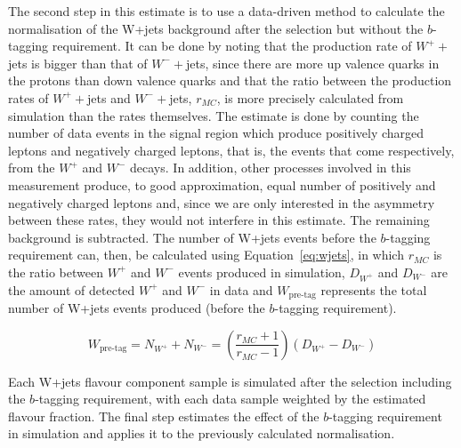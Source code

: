 The second step in this estimate is to use a data-driven method to calculate the normalisation of the W+jets background after the selection but without the $b$-tagging
requirement.
It can be done by noting that the production rate of $W^{+}+$jets is bigger than that of $W^{-}+$jets, since there are more up valence quarks in the protons than down valence
quarks and that the ratio between the production rates of $W^{+}+$jets and $W^{-}+$jets, $r_{MC}$, is more precisely calculated from simulation than the rates themselves.
The estimate is done by counting the number of data events in the signal region which produce positively charged leptons and negatively charged leptons, that is, the
events that come
respectively, from the $W^{+}$ and $W^{-}$ decays.
In addition,
other processes involved in this measurement produce, to good approximation, equal number of positively and negatively charged leptons and, since we are only interested
in the asymmetry between these rates, they would not interfere in this estimate. The remaining background is subtracted.
The number of W+jets events before the $b$-tagging requirement can, then, be calculated using Equation~\ref{eq:wjets}, in which $r_{MC}$ is the ratio between $W^{+}$ and
$W^{-}$ events produced in simulation, $D_{W^{+}}$ and $D_{W^{-}}$ are the amount of detected $W^{+}$ and $W^{-}$ in data and $W_{\textrm{pre-tag}}$ represents the total
number of W+jets events produced (before the $b$-tagging requirement).

\begin{equation}
\displaystyle
W_{\textrm{pre-tag}} = N_{W^{+}} + N_{W^{-}} = \left(\frac{r_{MC} + 1}{r_{MC} - 1}\right)  ( D_{W^{+}} - D_{W^{-}} )
\label{eq:wjets}
\end{equation}

Each W+jets flavour component sample is simulated after the selection including the $b$-tagging requirement, with each data sample weighted by the estimated flavour fraction.
The final step estimates the
effect of the $b$-tagging requirement in simulation and applies it to the previously calculated normalisation\cite{toppairxsec7tev,ttjets_confnote}.

